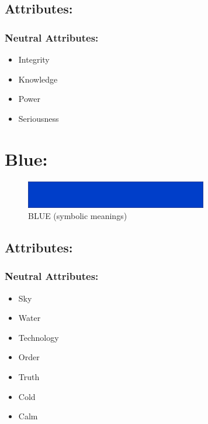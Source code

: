 \documentclass[openleft,oneside,showtrims]{memoir}
\begin{document}
\subsection{Attributes:}
\label{sec:orgf76a231}

\subsubsection*{Neutral Attributes:}
\label{sec:org93b94ea}

\begin{itemize}
\item Integrity
\item Knowledge
\item Power
\item Seriousness
\end{itemize}

\section{Blue:}
\label{sec:orgd81aece}

\begin{figure}[htbp]
\centering
\includegraphics[width=300px]{./media/blue-banner.png}
\caption{\label{fig:HAP-WR-006}BLUE (symbolic meanings)}
\end{figure}

\subsection{Attributes:}
\label{sec:org689ed2f}

\subsubsection*{Neutral Attributes:}
\label{sec:org15b2bda}

\begin{itemize}
\item Sky
\item Water
\item Technology
\item Order
\item Truth
\item Cold
\item Calm
\end{itemize}
\end{document}
